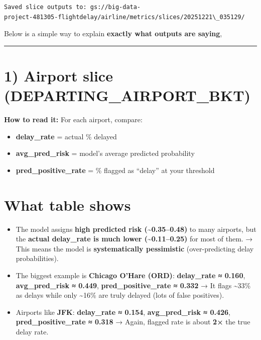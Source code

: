 \documentclass[11pt]{article}
\providecommand{\tightlist}{%
      \setlength{\itemsep}{0pt}\setlength{\parskip}{0pt}}
\begin{document}
    \begin{Verbatim}[commandchars=\\\{\}]
Saved slice outputs to: gs://big-data-
project-481305-flightdelay/airline/metrics/slices/20251221\_035129/
    \end{Verbatim}

    Below is a simple way to explain \textbf{exactly what outputs are
saying},

\begin{center}\rule{0.5\linewidth}{0.5pt}\end{center}

\section{1) Airport slice
(DEPARTING\_AIRPORT\_BKT)}\label{airport-slice-departing_airport_bkt}

\textbf{How to read it:} For each airport, compare:

\begin{itemize}
\tightlist
\item
  \textbf{delay\_rate} = actual \% delayed
\item
  \textbf{avg\_pred\_risk} = model's average predicted probability
\item
  \textbf{pred\_positive\_rate} = \% flagged as ``delay'' at your
  threshold
\end{itemize}

\section{What table shows}\label{what-table-shows}

\begin{itemize}
\item
  The model assigns \textbf{high predicted risk
  (\textasciitilde0.35--0.48)} to many airports, but the \textbf{actual
  delay\_rate is much lower (\textasciitilde0.11--0.25)} for most of
  them. → This means the model is \textbf{systematically pessimistic}
  (over-predicting delay probabilities).
\item
  The biggest example is \textbf{Chicago O'Hare (ORD)}:
  \textbf{delay\_rate ≈ 0.160}, \textbf{avg\_pred\_risk ≈ 0.449},
  \textbf{pred\_positive\_rate ≈ 0.332} → It flags \textasciitilde33\%
  as delays while only \textasciitilde16\% are truly delayed (lots of
  false positives).
\item
  Airports like \textbf{JFK}: \textbf{delay\_rate ≈ 0.154},
  \textbf{avg\_pred\_risk ≈ 0.426}, \textbf{pred\_positive\_rate ≈
  0.318} → Again, flagged rate is about \textbf{2×} the true delay rate.
\end{itemize}
\end{document}
